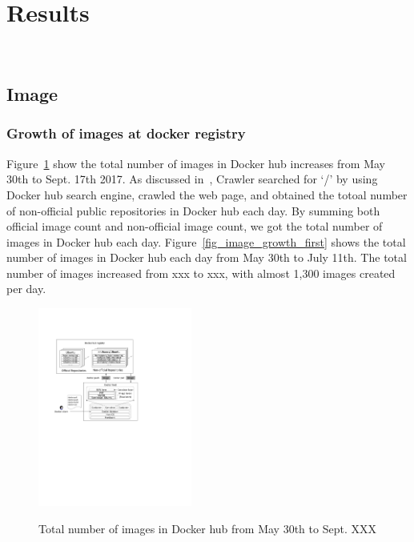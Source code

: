 
\section{Results}

\\

\subsection{Image}

\subsubsection{Growth  of images at docker registry}

Figure~\ref{fig_image_growth} show the total number of images in Docker hub increases from May 30th to Sept. 17th 2017. As discussed in~\cite{XXX}, Crawler searched for `/' by using Docker hub search engine, crawled the web page, and obtained the totoal number of non-official public repositories in Docker hub each day. By summing both official image count and non-official image count, we got the total number of images in Docker hub each day. Figure~\ref{fig_image_growth_first} shows the total number of images in Docker hub each day from May 30th to July 11th. The total number of images increased from xxx to xxx, with almost 1,300 images created per day.

\begin{figure}
  \centering
  \includegraphics[width=0.45\textwidth]{graphs/fig-docker-architecture}\\
  \caption{Total number of images in Docker hub from May 30th to Sept. XXX}\label{fig_image_growth}
\end{figure}

